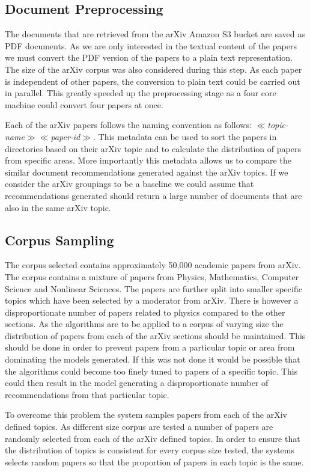 \subsection{Document Preprocessing}
The documents that are retrieved from the arXiv Amazon S3 bucket are saved as PDF documents.
As we are only interested in the textual content of the papers we must convert the PDF version of the papers to a plain text representation.
The size of the arXiv corpus was also considered during this step.
As each paper is independent of other papers, the conversion to plain text could be carried out in parallel.
This greatly speeded up the preprocessing stage as a four core machine could convert four papers at once.

Each of the arXiv papers follows the naming convention as follows: \textit{$\ll$topic-name$\gg\ll$paper-id$\gg$}.
This metadata can be used to sort the papers in directories based on their arXiv topic and to calculate the distribution of papers from specific areas.
More importantly this metadata allows us to compare the similar document recommendations generated against the arXiv topics.
If we consider the arXiv groupings to be a baseline we could assume that recommendations generated should return a large number of documents that are also in the same arXiv topic.

\subsection{Corpus Sampling}
The corpus selected contains approximately 50,000 academic papers from arXiv.
The corpus contains a mixture of papers from Physics, Mathematics, Computer Science and Nonlinear Sciences.
The papers are further split into smaller specific topics which have been selected by a moderator from arXiv.
There is however a disproportionate number of papers related to physics compared to the other sections.
As the algorithms are to be applied to a corpus of varying size the distribution of papers from each of the arXiv sections should be maintained.
This should be done in order to prevent papers from a particular topic or area from dominating the models generated.
If this was not done it would be possible that the algorithms could become too finely tuned to papers of a specific topic.
This could then result in the model generating a disproportionate number of recommendations from that particular topic.

To overcome this problem the system samples papers from each of the arXiv defined topics.
As different size corpus are tested a number of papers are randomly selected from each of the arXiv defined topics.
In order to ensure that the distribution of topics is consistent for every corpus size tested, the systems selects random papers so that the proportion of papers in each topic is the same.


